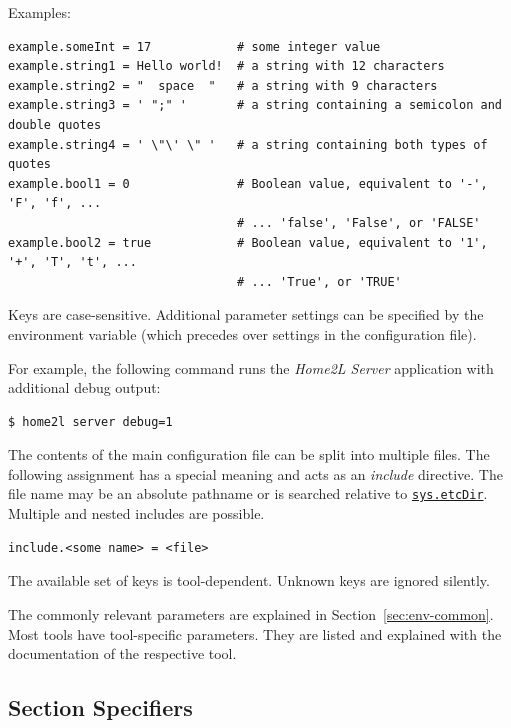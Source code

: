 \documentclass[12pt,english,parskip=half,headheight=19pt]{scrreprt}
\newcommand{\lst}[1]{\colorbox{lstbackground}{\footnotesize\code{#1}}}
\newcommand{\idx}[1]{#1\index{#1}}
\newcommand{\refenv}[1]{\hyperref[env:#1]{\texttt{#1}}}        %
\begin{document}
Examples:
\begin{lstlisting}
example.someInt = 17            # some integer value
example.string1 = Hello world!  # a string with 12 characters
example.string2 = "  space  "   # a string with 9 characters
example.string3 = ' ";" '       # a string containing a semicolon and double quotes
example.string4 = ' \"\' \" '   # a string containing both types of quotes
example.bool1 = 0               # Boolean value, equivalent to '-', 'F', 'f', ...
                                # ... 'false', 'False', or 'FALSE'
example.bool2 = true            # Boolean value, equivalent to '1', '+', 'T', 't', ...
                                # ... 'True', or 'TRUE'

\end{lstlisting}

Keys are case-sensitive. Additional parameter settings can be specified
by the \lst{HOME2L_CONF} environment variable (which precedes
over settings in the configuration file).

For example, the following command runs the
\textit{Home2L Server} application with additional debug output:
\begin{lstlisting}[language=bash]
  $ home2l server debug=1
\end{lstlisting}

The contents of the main configuration file can be split into multiple files.
The following assignment has a special meaning and acts as an \textit{include} directive.
The file name may be an absolute pathname or is searched relative to \refenv{sys.etcDir}.
Multiple and nested includes are possible.
\begin{lstlisting}
include.<some name> = <file>
\end{lstlisting}

The available set of keys is tool-dependent. Unknown keys are ignored silently.

The commonly relevant parameters are explained in Section~\ref{sec:env-common}.
Most tools have tool-specific parameters. They are listed and explained with the
documentation of the respective tool.





\subsection{Section Specifiers}
\label{sec:home2lconf-sectionspec}
\end{document}
